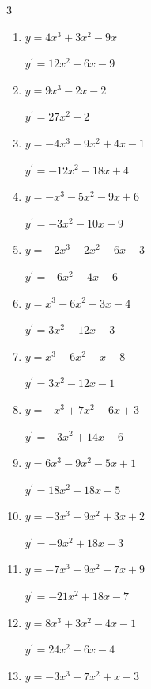 \begin{multicols}{3}
\begin{enumerate}
        $\displaystyle y^{\prime}=9x^{2}+8x+2$

  \item $y=4x^{3}+3x^{2}-9x$

        $\displaystyle y^{\prime}=12x^{2}+6x-9$

  \item $y=9x^{3}-2x-2$

        $\displaystyle y^{\prime}=27x^{2}-2$

  \item $y=-4x^{3}-9x^{2}+4x-1$

        $\displaystyle y^{\prime}=-12x^{2}-18x+4$

  \item $y=-x^{3}-5x^{2}-9x+6$

        $\displaystyle y^{\prime}=-3x^{2}-10x-9$

  \item $y=-2x^{3}-2x^{2}-6x-3$

        $\displaystyle y^{\prime}=-6x^{2}-4x-6$

  \item $y=x^{3}-6x^{2}-3x-4$

        $\displaystyle y^{\prime}=3x^{2}-12x-3$

  \item $y=x^{3}-6x^{2}-x-8$

        $\displaystyle y^{\prime}=3x^{2}-12x-1$

  \item $y=-x^{3}+7x^{2}-6x+3$

        $\displaystyle y^{\prime}=-3x^{2}+14x-6$

\columnbreak %

  \item $y=6x^{3}-9x^{2}-5x+1$

        $\displaystyle y^{\prime}=18x^{2}-18x-5$

  \item $y=-3x^{3}+9x^{2}+3x+2$

        $\displaystyle y^{\prime}=-9x^{2}+18x+3$

  \item $y=-7x^{3}+9x^{2}-7x+9$

        $\displaystyle y^{\prime}=-21x^{2}+18x-7$

  \item $y=8x^{3}+3x^{2}-4x-1$

        $\displaystyle y^{\prime}=24x^{2}+6x-4$

  \item $y=-3x^{3}-7x^{2}+x-3$


\end{enumerate}
\end{multicols}
